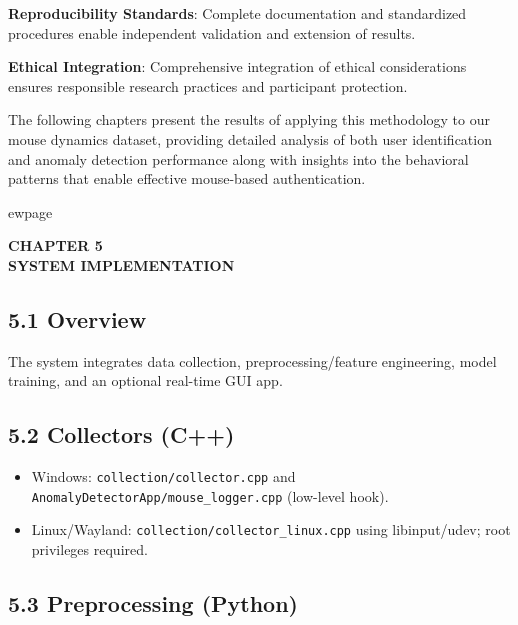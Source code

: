 \documentclass[
  11pt,
  a4paper,
]{article}
\providecommand{\tightlist}{%
  \setlength{\itemsep}{0pt}\setlength{\parskip}{0pt}}
\begin{document}
\textbf{Reproducibility Standards}: Complete documentation and
standardized procedures enable independent validation and extension of
results.

\textbf{Ethical Integration}: Comprehensive integration of ethical
considerations ensures responsible research practices and participant
protection.

The following chapters present the results of applying this methodology
to our mouse dynamics dataset, providing detailed analysis of both user
identification and anomaly detection performance along with insights
into the behavioral patterns that enable effective mouse-based
authentication.

ewpage

\newpage
\thispagestyle{plain}

\begin{center}
\vspace*{2cm}
\textbf{\Large CHAPTER 5}\\[0.5cm]
\textbf{\Large SYSTEM IMPLEMENTATION}
\end{center}

\newpage

\subsection{5.1 Overview}\label{overview}

The system integrates data collection, preprocessing/feature
engineering, model training, and an optional real-time GUI app.

\subsection{5.2 Collectors (C++)}\label{collectors-c}

\begin{itemize}
\tightlist
\item
  Windows: \texttt{collection/collector.cpp} and
  \texttt{AnomalyDetectorApp/mouse\_logger.cpp} (low-level hook).
\item
  Linux/Wayland: \texttt{collection/collector\_linux.cpp} using
  libinput/udev; root privileges required.
\end{itemize}

\subsection{5.3 Preprocessing (Python)}\label{preprocessing-python}
\end{document}
